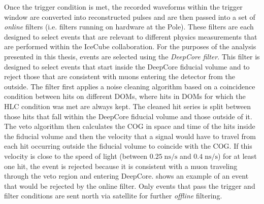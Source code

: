 Once the trigger condition is met, the recorded waveforms within the trigger window are converted into reconstructed pulses and are then passed into a set of \emph{online} filters (i.e. filters running on hardware at the Pole). These filters are each designed to select events that are relevant to different physics measurements that are performed within the IceCube collaboration. For the purposes of the analysis presented in this thesis, events are selected using the \emph{DeepCore filter}. This filter is designed to select events that start inside the DeepCore fiducial volume and to reject those that are consistent with muons entering the detector from the outside. The filter first applies a noise cleaning algorithm based on a coincidence condition between hits on different DOMs, where hits in DOMs for which the HLC condition was met are always kept. The cleaned hit series is split between those hits that fall within the DeepCore fiducial volume and those outside of it. The veto algorithm then calculates the COG in space and time of the hits inside the fiducial volume and then the velocity that a signal would have to travel from each hit occurring outside the fiducial volume to coincide with the COG. If this velocity is close to the speed of light (between $0.25\;\mathrm{ns/s}$ and $0.4\;\mathrm{ns/s}$) for at least one hit, the event is rejected because it is consistent with a muon traveling through the veto region and entering DeepCore.  shows an example of an event that would be rejected by the online filter. Only events that pass the trigger and filter conditions are sent north via satellite for further \emph{offline} filtering.
